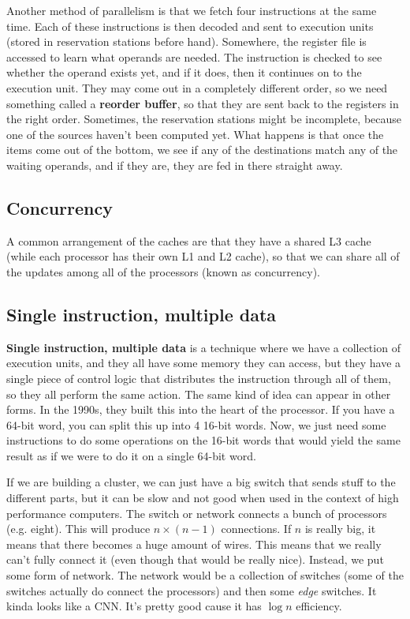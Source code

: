 \documentclass[11pt,a4paper,titlepage,dvipsnames,cmyk]{scrartcl}
\begin{document}
Another method of parallelism is that we fetch four instructions at the
same time. Each of these instructions is then decoded and sent to
execution units (stored in reservation stations before hand). Somewhere,
the register file is accessed to learn what operands are needed. The
instruction is checked to see whether the operand exists yet, and if it
does, then it continues on to the execution unit. They may come out in a
completely different order, so we need something called a \textbf{reorder
buffer}, so that they are sent back to the registers in the right order.
Sometimes, the reservation stations might be incomplete, because one of
the sources haven't been computed yet. What happens is that once the items
come out of the bottom, we see if any of the destinations match any of the
waiting operands, and if they are, they are fed in there straight away.

\subsection{Concurrency}%
\label{sub:concurrency}

A common arrangement of the caches are that they have a shared L3 cache
(while each processor has their own L1 and L2 cache), so that we can share
all of the updates among all of the processors (known as concurrency).

\subsection{Single instruction, multiple data}%
\label{sub:simd}

\textbf{Single instruction, multiple data} is a technique where we have a
collection of execution units, and they all have some memory they can
access, but they have a single piece of control logic that distributes the
instruction through all of them, so they all perform the same action.
The same kind of idea can appear in other forms. In the 1990s, they built
this into the heart of the processor. If you have a 64-bit word, you can
split this up into 4 16-bit words. Now, we just need some instructions to
do some operations on the 16-bit words that would yield the same result as
if we were to do it on a single 64-bit word.

If we are building a cluster, we can just have a big switch that sends
stuff to the different parts, but it can be slow and not good when
used in the context of high performance computers. The switch or network
connects a bunch of processors (e.g. eight). This will produce $n \times
(n-1)$ connections. If $n$ is really big, it means that there becomes a
huge amount of wires. This means that we really can't fully connect it
(even though that would be really nice). Instead, we put some form of
network. The network would be a collection of switches (some of the
switches actually do connect the processors) and then some \textit{edge}
switches. It kinda looks like a CNN. It's pretty good cause it has $\log
n$ efficiency.
\end{document}
